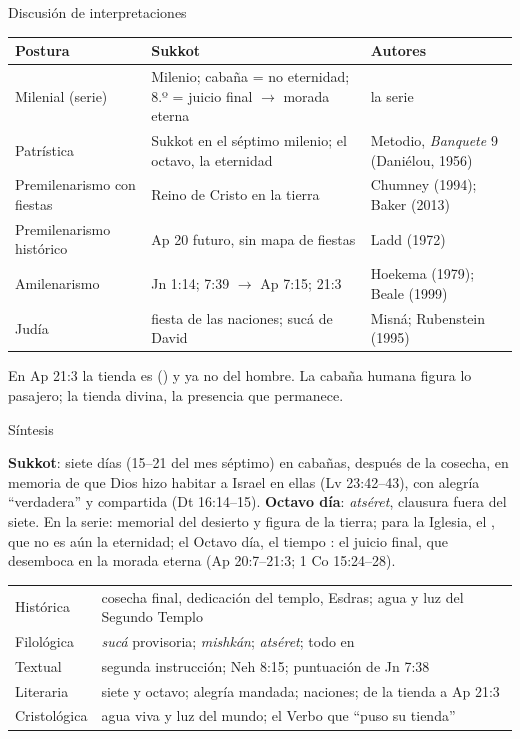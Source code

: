 \begin{frame}{Discusión de interpretaciones}
\scriptsize\renewcommand{\arraystretch}{1.12}
\begin{tabular}{@{}L{2.5cm}L{5.0cm}L{4.2cm}@{}}
\toprule
\textbf{Postura} & \textbf{Sukkot} & \textbf{Autores} \\ \midrule
Milenial (serie) & Milenio; cabaña = no eternidad; 8.º = juicio final $\rightarrow$ morada eterna & la serie \\
Patrística & Sukkot en el séptimo milenio; el octavo, la eternidad & Metodio, \emph{Banquete} 9 (Daniélou, 1956) \\
Premilenarismo con fiestas & Reino de Cristo en la tierra & Chumney (1994); Baker (2013) \\
Premilenarismo histórico & Ap 20 futuro, sin mapa de fiestas & Ladd (1972) \\
Amilenarismo & Jn 1:14; 7:39 $\rightarrow$ Ap 7:15; 21:3 & Hoekema (1979); Beale (1999) \\
Judía & fiesta de las naciones; sucá de David & Misná; Rubenstein (1995) \\
\bottomrule
\end{tabular}\par\medskip
\small En Ap 21:3 la tienda es  () y ya no del hombre. La cabaña humana figura lo pasajero; la tienda divina, la presencia que permanece.
\end{frame}

\begin{frame}{Síntesis}
\begin{tcolorbox}[colback=papiro,colframe=tierraroja,boxrule=1pt,arc=3pt,left=5pt,right=5pt]
\scriptsize \textbf{Sukkot}: siete días (15--21 del mes séptimo) en cabañas, después de la cosecha, en memoria de que Dios hizo habitar a Israel en ellas (Lv 23:42--43), con alegría ``verdadera'' y compartida (Dt 16:14--15). \textbf{Octavo día}: \emph{atséret}, clausura fuera del siete. En la serie: memorial del desierto y figura de la tierra; para la Iglesia, el , que no es aún la eternidad; el Octavo día, el tiempo : el juicio final, que desemboca en la morada eterna (Ap 20:7--21:3; 1 Co 15:24--28).
\end{tcolorbox}
\scriptsize\renewcommand{\arraystretch}{1.08}
\begin{tabular}{@{}L{2.0cm}L{9.8cm}@{}}
\toprule
Histórica & cosecha final, dedicación del templo, Esdras; agua y luz del Segundo Templo \\
Filológica & \emph{sucá} provisoria; \emph{mishkán}; \emph{atséret}; todo en  \\
Textual & segunda instrucción; Neh 8:15; puntuación de Jn 7:38 \\
Literaria & siete y octavo; alegría mandada; naciones; de la tienda a Ap 21:3 \\
Cristológica & agua viva y luz del mundo; el Verbo que ``puso su tienda'' \\
\bottomrule
\end{tabular}
\end{frame}

